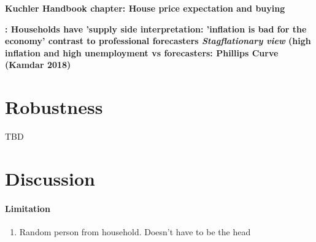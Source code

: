 \documentclass[ProjectABM]{subfiles}
\begin{document}
\textbf{Kuchler Handbook chapter: House price expectation and buying}

\textbf{\cite{CCG_2020_inflation_communication}: Households have 'supply side interpretation: 'inflation is bad for the economy' contrast to professional forecasters \textit{Stagflationary view} (high inflation and high unemployment vs forecasters: Phillips Curve (Kamdar 2018)}

\section{Robustness}\label{sec:robustness}
TBD

\section{Discussion}\label{sec:discussion}
\paragraph{Limitation}
\begin{enumerate}
	\item Random person from household. Doesn't have to be the head
\end{enumerate}

\onlyinsubfile{}
%
\end{document}

